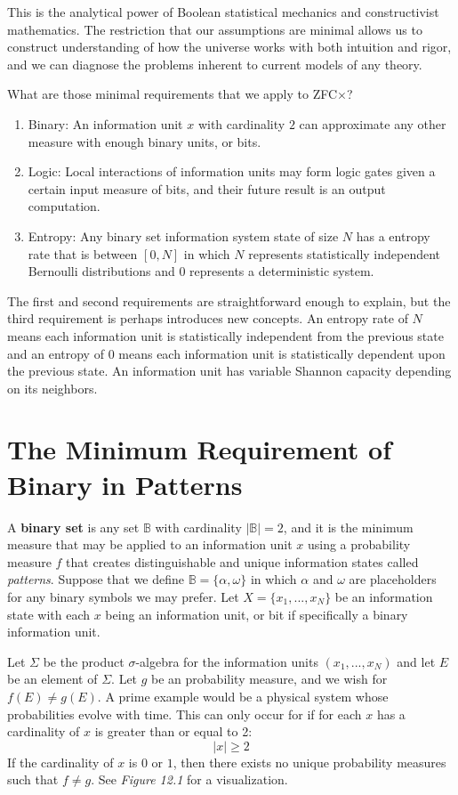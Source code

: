 \documentclass[10pt, a5paper, twoside, openright]{memoir}
\begin{document}
This is the analytical power of Boolean statistical mechanics and constructivist mathematics. The restriction that our assumptions are minimal allows us to construct understanding of how the universe works with both intuition and rigor, and we can diagnose the problems inherent to current models of any theory.

What are those minimal requirements that we apply to ZFC$\times$?
\begin{enumerate}
\item Binary: An information unit $x$ with cardinality $2$ can approximate any other measure with enough binary units, or bits.
\item Logic: Local interactions of information units may form logic gates given a certain input measure of bits, and their future result is an output computation.
\item Entropy: Any binary set information system state of size $N$ has a entropy rate that is between $[0, N]$ in which $N$ represents statistically independent Bernoulli distributions and $0$ represents a deterministic system. 
\end{enumerate}
The first and second requirements are straightforward enough to explain, but the third requirement is perhaps introduces new concepts. An entropy rate of $N$ means each information unit is statistically independent from the previous state and an entropy of $0$ means each information unit is statistically dependent upon the previous state. An information unit has variable Shannon capacity depending on its neighbors.

\section{The Minimum Requirement of Binary in Patterns}
A \textbf{binary set} is any set $\mathbb B$ with cardinality $| \mathbb B| = 2$, and it is the minimum measure that may be applied to an information unit $x$ using a probability measure $f$ that creates distinguishable and unique information states called \textit{patterns}. Suppose that we define $\mathbb B = \{\alpha, \omega \}$ in which $\alpha$ and $\omega$ are placeholders for any binary symbols we may prefer. Let $X = \{x_1 ,..., x_N\}$ be an information state with each $x$ being an information unit, or bit if specifically a binary information unit. 

Let $\Sigma$ be the product $\sigma$-algebra for the information units $(x_1,...,x_N)$ and let $E$ be an element of $\Sigma$. Let $g$ be an probability measure, and we wish for $f(E) \neq g(E)$. A prime example would be a physical system whose probabilities evolve with time. This can only occur for if for each $x$ has a cardinality of $x$ is greater than or equal to 2:
$$|x| \geq 2$$
If the cardinality of $x$ is $0$ or $1$, then there exists no unique probability measures such that $f \neq g$. See \textit{Figure 12.1} for a visualization.
\end{document}
